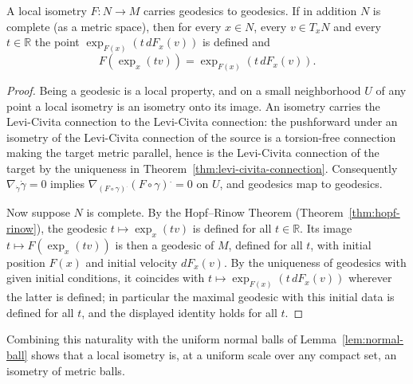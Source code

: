 \begin{lemma}
\label{lem:local-isometry-exponential}



A local isometry $F\colon N\to M$ carries geodesics to geodesics.
If in addition $N$ is complete (as a metric space), then for every
$x\in N$, every $v\in T_xN$ and every $t\in \mathbb{R}$ the point
$\exp_{F(x)}\left(t\,dF_x(v)\right)$ is defined and
$$F\left(\exp_x(tv)\right)=\exp_{F(x)}\left(t\,dF_x(v)\right).$$
\end{lemma}

\begin{proof}
\sketch
{}
Being a geodesic is a local property, and on a small neighborhood
$U$ of any point a local isometry is an isometry onto its image. An
isometry carries the Levi-Civita connection to the Levi-Civita
connection: the pushforward under an isometry of the Levi-Civita
connection of the source is a torsion-free connection making the
target metric parallel, hence is the Levi-Civita connection of the
target by the uniqueness in
Theorem~\ref{thm:levi-civita-connection}. Consequently
$\nabla_{\dot\gamma}\dot\gamma=0$ implies $\nabla_{(F\circ
\gamma)^{\textstyle .}}(F\circ\gamma)^{\textstyle .}=0$ on $U$, and
geodesics map to geodesics.

Now suppose $N$ is complete. By the Hopf--Rinow Theorem
(Theorem~\ref{thm:hopf-rinow}), the geodesic
$t\mapsto\exp_x(tv)$ is defined for all $t\in\mathbb{R}$. Its image
$t\mapsto F(\exp_x(tv))$ is then a geodesic of $M$, defined for all
$t$, with initial position $F(x)$ and initial velocity $dF_x(v)$. By
the uniqueness of geodesics with given initial conditions, it
coincides with $t\mapsto \exp_{F(x)}(t\,dF_x(v))$ wherever the
latter is defined; in particular the maximal geodesic with this
initial data is defined for all $t$, and the displayed identity
holds for all $t$.
\end{proof}

Combining this naturality with the uniform normal balls of
Lemma~\ref{lem:normal-ball} shows that a local isometry is, at a
uniform scale over any compact set, an isometry of metric balls.

